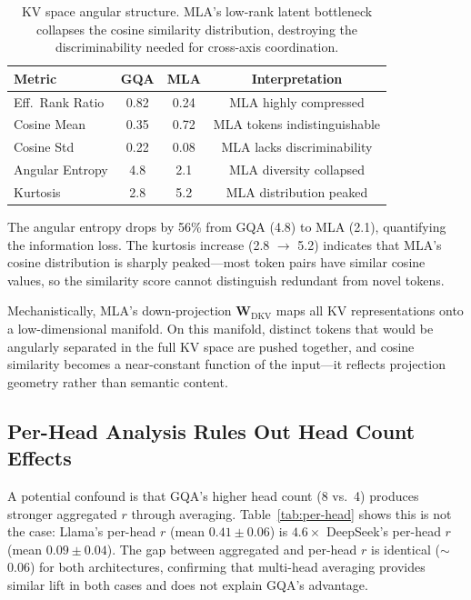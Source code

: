\documentclass[11pt,a4paper]{article}
\begin{document}
\begin{table}[t]
\centering
\small
\begin{tabular}{lccc}
\toprule
\textbf{Metric} & \textbf{GQA} & \textbf{MLA} & \textbf{Interpretation} \\
\midrule
Eff.\ Rank Ratio & 0.82 & 0.24 & MLA highly compressed \\
Cosine Mean      & 0.35 & 0.72 & MLA tokens indistinguishable \\
Cosine Std       & 0.22 & 0.08 & MLA lacks discriminability \\
Angular Entropy  & 4.8  & 2.1  & MLA diversity collapsed \\
Kurtosis         & 2.8  & 5.2  & MLA distribution peaked \\
\bottomrule
\end{tabular}
\caption{KV space angular structure. MLA's low-rank latent bottleneck collapses the cosine similarity distribution, destroying the discriminability needed for cross-axis coordination.}
\label{tab:angular}
\end{table}

The angular entropy drops by 56\% from GQA (4.8) to MLA (2.1), quantifying the information loss.
The kurtosis increase (2.8 $\rightarrow$ 5.2) indicates that MLA's cosine distribution is sharply peaked---most token pairs have similar cosine values, so the similarity score cannot distinguish redundant from novel tokens.

Mechanistically, MLA's down-projection $\mathbf{W}_\text{DKV}$ maps all KV representations onto a low-dimensional manifold.
On this manifold, distinct tokens that would be angularly separated in the full KV space are pushed together, and cosine similarity becomes a near-constant function of the input---it reflects projection geometry rather than semantic content.

\subsection{Per-Head Analysis Rules Out Head Count Effects}
\label{sec:per-head}

A potential confound is that GQA's higher head count (8 vs.\ 4) produces stronger aggregated $r$ through averaging.
Table~\ref{tab:per-head} shows this is not the case: Llama's per-head $r$ (mean $0.41 \pm 0.06$) is $4.6\times$ DeepSeek's per-head $r$ (mean $0.09 \pm 0.04$).
The gap between aggregated and per-head $r$ is identical ($\sim$0.06) for both architectures, confirming that multi-head averaging provides similar lift in both cases and does not explain GQA's advantage.
\end{document}
